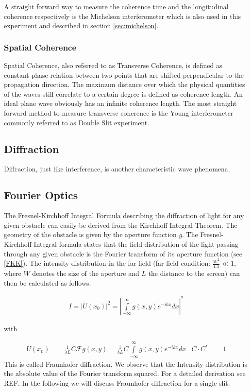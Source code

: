 A straight forward way to measure the coherence time and the longitudinal coherence respectively is the Michelson interferometer which is also used in this experiment and described in section \ref{sec:michelson}.
\subsubsection{Spatial Coherence}
Spatial Coherence, also referred to as Transverse Coherence, is defined as constant phase relation between two points that are shifted perpendicular to the propagation direction. The maximum distance over which the physical quantities of the waves still correlate to a certain degree is defined as coherence length. An ideal plane wave obviously has an infinite coherence length. The most straight forward method to measure transverse coherence is the Young interferometer commonly referred to as Double Slit experiment.

\subsection{Diffraction}

Diffraction, just like interference, is another characteristic wave phenomena.

\subsection{Fourier Optics}

The Fresnel-Kirchhoff Integral Formula describing the diffraction of light for any given obstacle can easily be derived from the Kirchhoff Integral Theorem. The geometry of the obstacle is given by the aperture function $g$. The Fresnel-Kirchhoff Integral formula states that the field distribution of the light passing through any given obstacle is the Fourier transform of its aperture function (see \ref{FKK}). The intensity distribution in the far field (far field condition: $\frac{W^2}{L\lambda} \ll 1$, where $W$ denotes the size of the aperture and $L$ the distance to the screen) can then be calculated as follows:


\begin{align}
I=|U(x_0)|^2=\left| \int\limits_{-\infty}^{\infty} g(x,y)e^{-ikx}dx \right|^2
\end{align}

with 

\begin{align}
  U(x_0) &= \frac{1}{\lambda L} C \mathscr{F}{g(x, y)}    = \frac{1}{\lambda L} C   \int\limits_{-\infty}^{\infty}  g(x,y)e^{-ikx}dx    &  C  \cdot C^* &= 1                         \label{FKK}
\end{align}
This is called Fraunhofer diffraction. We observe that the Intensity distribution is the absolute value of the Fourier transform squared. For a detailed derivation see REF.
In the following we will discuss Fraunhofer diffraction for a single slit.

